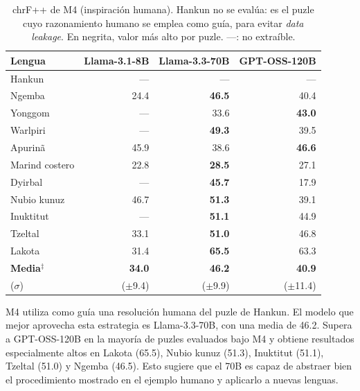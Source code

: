 \begin{table}[H]
	\centering
	\caption{chrF++ de M4 (inspiración humana). Hankun no se evalúa: es el puzle cuyo razonamiento humano se emplea como guía, para evitar \textit{data leakage}. En negrita, valor más alto por puzle. {\color{gray}---}: no extraíble.}
	\label{tab:resultados_m4}
	{\fontsize{10.5pt}{12pt}\selectfont
		\begin{tabular*}{0.95\textwidth}{@{\extracolsep{\fill}} lrrr}
			\toprule
			\textbf{Lengua} & \textbf{Llama-3.1-8B} & \textbf{Llama-3.3-70B} & \textbf{GPT-OSS-120B} \\
			\midrule
			Hankun          & {\color{gray}---} & {\color{gray}---} & {\color{gray}---} \\
			Ngemba          & 24.4              & \textbf{46.5}     & 40.4              \\
			Yonggom         & {\color{gray}---} & 33.6              & \textbf{43.0}     \\
			Warlpiri        & {\color{gray}---} & \textbf{49.3}     & 39.5              \\
			Apurinã         & 45.9              & 38.6              & \textbf{46.6}     \\
			Marind costero  & 22.8              & \textbf{28.5}     & 27.1              \\
			Dyirbal         & {\color{gray}---} & \textbf{45.7}     & 17.9              \\
			Nubio kunuz     & 46.7              & \textbf{51.3}     & 39.1              \\
			Inuktitut       & {\color{gray}---} & \textbf{51.1}     & 44.9              \\
			Tzeltal         & 33.1              & \textbf{51.0}     & 46.8              \\
			Lakota          & 31.4              & \textbf{65.5}     & 63.3              \\
			\midrule
			\textbf{Media$^\ddagger$} & \textbf{34.0} & \textbf{46.2} & \textbf{40.9} \\
			($\sigma$) & ($\pm$9.4) & ($\pm$9.9) & ($\pm$11.4) \\
			\bottomrule
		\end{tabular*}
	}
\end{table}

M4 utiliza como guía una resolución humana del puzle de Hankun. El modelo que mejor aprovecha esta estrategia es Llama-3.3-70B, con una media de 46.2. Supera a GPT-OSS-120B en la mayoría de puzles evaluados bajo M4 y obtiene resultados especialmente altos en Lakota (65.5), Nubio kunuz (51.3), Inuktitut (51.1), Tzeltal (51.0) y Ngemba (46.5). Esto sugiere que el 70B es capaz de abstraer bien el procedimiento mostrado en el ejemplo humano y aplicarlo a nuevas lenguas.

